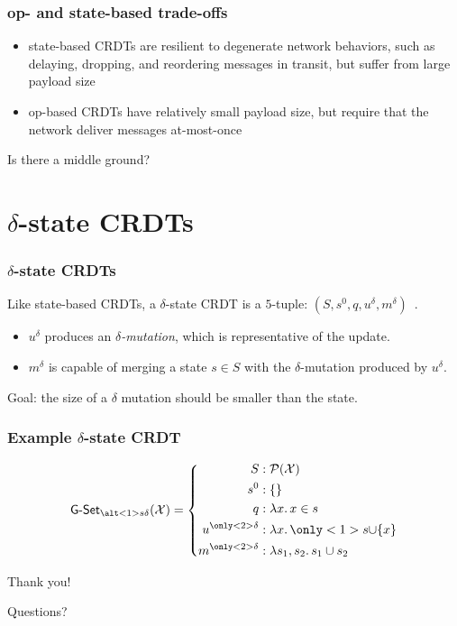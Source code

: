 \documentclass[aspectratio=169,compress,handout]{beamer}
\newcommand*{\CRDT}{\textsf{CRDT}\xspace}
\newcommand*{\CRDTs}{\textsf{CRDTs}\xspace}
\begin{document}
  \begin{frame}
    \frametitle{op- and state-based trade-offs}
    \begin{itemize}[<+->]
      \item state-based \CRDTs are resilient to degenerate network behaviors,
        such as delaying, dropping, and reordering messages in transit, but
        suffer from large payload size
      \item op-based \CRDTs have relatively small payload size, but require that
        the network deliver messages at-most-once
    \end{itemize}
    \pause
    Is there a middle ground?
  \end{frame}

  \section{$\delta$-state \CRDTs}
  \begin{frame}
    \frametitle{$\delta$-state \CRDTs}
    Like state-based \CRDTs, a $\delta$-state \CRDT is a $5$-tuple: $(S, s^0, q,
    u^\delta, m^\delta)$~\citep{almeida18}.
    \begin{itemize}
      \item $u^\delta$ produces an \emph{$\delta$-mutation}, which is
        representative of the update.
      \item $m^\delta$ is capable of merging a state $s \in S$ with the
        $\delta$-mutation produced by $u^\delta$.
    \end{itemize}
    Goal: the size of a $\delta$ mutation should be smaller than the state.
  \end{frame}

  \begin{frame}
  \frametitle{Example $\delta$-state \CRDT}
    \[
      \textsf{G-Set}_{\alt<1>{s}{\delta}}(\mathcal{X}) = \left\{\begin{aligned}
        S &: \mathcal{P}(\mathcal{X}) \\
        s^0 &: \{ \} \\
        q &: \lambda x.\, x \in s \\
        u^{\only<2>{\delta}} &: \lambda x.\, \only<1>{s \cup} \{ x \} \\
        m^{\only<2>{\delta}} &: \lambda s_1, s_2.\, s_1 \cup s_2 \\
      \end{aligned}\right.
    \]
    \pause
  \end{frame}

  \begin{frame}
    \centering
    \huge{Thank you!}

    \pause
    Questions?
  \end{frame}

  \begin{frame}[allowframebreaks]
    
    
  \end{frame}
\end{document}
